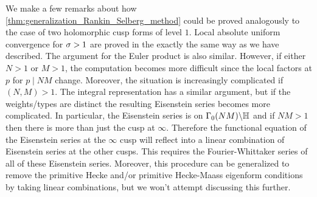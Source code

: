       We make a few remarks about how \cref{thm:generalization_Rankin_Selberg_method} could be proved analogously to the case of two holomorphic cusp forms of level $1$. Local absolute uniform convergence for $\sigma > 1$ are proved in the exactly the same way as we have described. The argument for the Euler product is also similar. However, if either $N > 1$ or $M > 1$, the computation becomes more difficult since the local factors at $p$ for $p \mid NM$ change. Moreover, the situation is increasingly complicated if $(N,M) > 1$. The integral representation has a similar argument, but if the weights/types are distinct the resulting Eisenstein series becomes more complicated. In particular, the Eisenstein series is on $\Gamma_{0}(NM)\backslash\mathbb{H}$ and if $NM > 1$ then there is more than just the cusp at $\infty$. Therefore the functional equation of the Eisenstein series at the $\infty$ cusp will reflect into a linear combination of Eisenstein series at the other cusps. This requires the Fourier-Whittaker series of all of these Eisenstein series. Moreover, this procedure can be generalized to remove the primitive Hecke and/or primitive Hecke-Maass eigenform conditions by taking linear combinations, but we won't attempt discussing this further.
